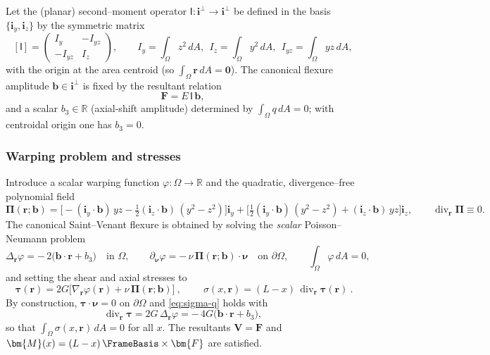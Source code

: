 Let the (planar) second–moment operator $\bm{\mathsf{I}}:\mathbf{i}^\perp\to \mathbf{i}^\perp$ be defined in the basis $\{\mathbf{i}_y,\mathbf{i}_z\}$ by the symmetric matrix
\[
[\bm{\mathsf{I}}]=
\begin{pmatrix}
I_y & -I_{yz}\\
-I_{yz} & I_z
\end{pmatrix},
\qquad
I_y=\int_\Omega z^2\,dA,\ \ I_z=\int_\Omega y^2\,dA,\ \ I_{yz}=\int_\Omega y z\,dA,
\]
with the origin at the area centroid (so $\int_\Omega \bm{r}\,dA=\mathbf{0}$). The canonical flexure amplitude $\bm{b}\in\mathbf{i}^\perp$ is fixed by the resultant relation
\begin{equation}
\bm{F}=E\,\bm{\mathsf{I}}\,\bm{b},
\label{eq:F-EIb}
\end{equation}
and a scalar $b_3\in\mathbb{R}$ (axial-shift amplitude) determined by $\int_\Omega q\,dA=0$; with centroidal origin one has $b_3=0$.

\subsubsection*{Warping problem and stresses}

Introduce a scalar warping function $\varphi:\Omega\to\mathbb{R}$ and the quadratic, divergence–free polynomial field
\begin{equation}
\bm{\Pi}(\bm{r};\bm{b})
=
\Big[-(\mathbf{i}_y\cdot\bm{b})\,y z-\tfrac12(\mathbf{i}_z\cdot\bm{b})\,(y^2-z^2)\Big]\mathbf{i}_y
+\Big[\tfrac12(\mathbf{i}_y\cdot\bm{b})\,(y^2-z^2)+(\mathbf{i}_z\cdot\bm{b})\,y z\Big]\mathbf{i}_z,
\qquad \operatorname{div}_{\!\bm{r}}\bm{\Pi}\equiv 0.
\label{eq:Pidef}
\end{equation}
The canonical Saint–Venant flexure is obtained by solving the \emph{scalar} Poisson–Neumann problem
\begin{equation}
\Delta_{\!\bm{r}}\varphi = -\,2\big(\bm{b}\cdot\bm{r}+b_3\big)\quad\text{in }\Omega,
\qquad
\partial_{\bm{\nu}}\varphi = -\,\nu\,\bm{\Pi}(\bm{r};\bm{b})\cdot\bm{\nu}\quad\text{on }\partial\Omega,
\qquad
\int_\Omega \varphi\,dA=0,
\label{eq:phiBVP}
\end{equation}
and setting the shear and axial stresses to
\begin{equation}
\boxed{\ \bm{\tau}(\bm{r})=2G\Big[\nabla_{\!\bm{r}}\varphi(\bm{r})+\nu\,\bm{\Pi}(\bm{r};\bm{b})\Big]\ },
\qquad
\boxed{\ \sigma(x,\bm{r})=(L-x)\,\operatorname{div}_{\!\bm{r}}\bm{\tau}(\bm{r})\ }.
\label{eq:stress-final}
\end{equation}
By construction, $\bm{\tau}\cdot\bm{\nu}=0$ on $\partial\Omega$ and \eqref{eq:sigma-q} holds with
\[
\operatorname{div}_{\!\bm{r}}\bm{\tau}=2G\,\Delta_{\!\bm{r}}\varphi=-\,4G\big(\bm{b}\cdot\bm{r}+b_3\big),
\]
so that $\int_\Omega \sigma(x,\bm{r})\,dA=0$ for all $x$. The resultants $\bm{V}=\bm{F}$ and $\bm{M}(x)=(L-x)\,\FrameBasis\times\bm{F}$ are satisfied.

